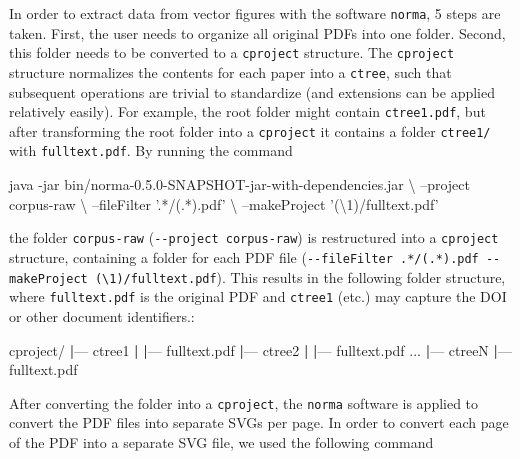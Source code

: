\documentclass[a5paper]{book}
\newenvironment{Shaded}{\begin{snugshade}}{\end{snugshade}}
\newcommand{\KeywordTok}[1]{\textcolor[rgb]{0.13,0.29,0.53}{\textbf{#1}}}
\newcommand{\StringTok}[1]{\textcolor[rgb]{0.31,0.60,0.02}{#1}}
\newcommand{\ExtensionTok}[1]{#1}
\newcommand{\NormalTok}[1]{#1}
\begin{document}
In order to extract data from vector figures with the software
\texttt{norma}, 5 steps are taken. First, the user needs to organize all
original PDFs into one folder. Second, this folder needs to be converted
to a \texttt{cproject} structure. The \texttt{cproject} structure
normalizes the contents for each paper into a \texttt{ctree}, such that
subsequent operations are trivial to standardize (and extensions can be
applied relatively easily). For example, the root folder might contain
\texttt{ctree1.pdf}, but after transforming the root folder into a
\texttt{cproject} it contains a folder \texttt{ctree1/} with
\texttt{fulltext.pdf}. By running the command

\begin{Shaded}
\begin{Highlighting}[]
\ExtensionTok{java}\NormalTok{ -jar bin/norma-0.5.0-SNAPSHOT-jar-with-dependencies.jar \textbackslash{}}
\NormalTok{  --project corpus-raw \textbackslash{}}
\NormalTok{  --fileFilter }\StringTok{'.*/(.*).pdf'}\NormalTok{ \textbackslash{}}
\NormalTok{  --makeProject }\StringTok{'(\textbackslash{}1)/fulltext.pdf'}
\end{Highlighting}
\end{Shaded}

the folder \texttt{corpus-raw} (\texttt{-\/-project\ corpus-raw}) is
restructured into a \texttt{cproject} structure, containing a folder for
each PDF file
(\texttt{-\/-fileFilter\ \textquotesingle{}.*/(.*).pdf\textquotesingle{}\ -\/-makeProject\ \textquotesingle{}(\textbackslash{}1)/fulltext.pdf\textquotesingle{}}).
This results in the following folder structure, where
\texttt{fulltext.pdf} is the original PDF and \texttt{ctree1} (etc.) may
capture the DOI or other document identifiers.:

\begin{Shaded}
\begin{Highlighting}[]
\ExtensionTok{cproject/}
\KeywordTok{|}\ExtensionTok{---}\NormalTok{ ctree1}
\KeywordTok{|}   \KeywordTok{|}\ExtensionTok{---}\NormalTok{ fulltext.pdf}
\KeywordTok{|}\ExtensionTok{---}\NormalTok{ ctree2}
\KeywordTok{|}   \KeywordTok{|}\ExtensionTok{---}\NormalTok{ fulltext.pdf}
\ExtensionTok{...}
\KeywordTok{|}\ExtensionTok{---}\NormalTok{ ctreeN}
    \KeywordTok{|}\ExtensionTok{---}\NormalTok{ fulltext.pdf}
\end{Highlighting}
\end{Shaded}

After converting the folder into a \texttt{cproject}, the \texttt{norma}
software is applied to convert the PDF files into separate SVGs per
page. In order to convert each page of the PDF into a separate SVG file,
we used the following command
\end{document}
